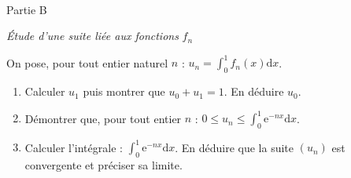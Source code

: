 ~
\begin{h3}Partie B\end{h3} \textit{Étude d'une suite liée aux fonctions} $f_{n}$
\par
On pose, pour tout entier naturel $n$ : $u_{n}=\int_{0}^{1}  f_{n}\left(x\right) \text{d}x$.
\begin{enumerate}
     \item
     Calculer $u_{1}$ puis montrer que $u_{0}+u_{1}=1$. En déduire $u_{0}$.
     \item
     Démontrer que, pour tout entier $n$ : $0 \leqslant u_{n}  \leqslant  \int_{0}^{1} \text{e}^{-nx} \text{d}x$.
     \item
Calculer l'intégrale : $\int_{0}^{1} \text{e}^{-nx} \text{d}x$. En déduire que la suite $\left(u_{n}\right)$ est convergente et préciser sa limite. \end{enumerate}
